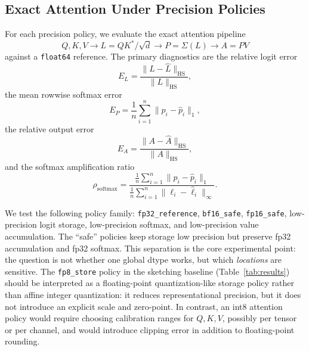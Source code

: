\subsection{Exact Attention Under Precision Policies}

For each precision policy, we evaluate the exact attention pipeline
\[
    Q,K,V \to L = QK^*/\sqrt d \to P = \Sigma(L) \to A = PV
\]
against a \texttt{float64} reference. The primary diagnostics are the relative logit error
\[
    E_L = \frac{\|L-\widehat L\|_{\mathrm{HS}}}{\|L\|_{\mathrm{HS}}},
\]
the mean rowwise softmax error
\[
    E_P = \frac1n \sum_{i=1}^n \|p_i-\widehat p_i\|_1,
\]
the relative output error
\[
    E_A = \frac{\|A-\widehat A\|_{\mathrm{HS}}}{\|A\|_{\mathrm{HS}}},
\]
and the softmax amplification ratio
\[
    \rho_{\mathrm{softmax}} = \frac{\frac1n \sum_{i=1}^n \|p_i-\widehat p_i\|_1}{\frac1n \sum_{i=1}^n \|\ell_i-\widehat \ell_i\|_\infty}.
\]

We test the following policy family: \texttt{fp32\_reference}, \texttt{bf16\_safe}, \texttt{fp16\_safe}, low-precision logit storage, low-precision softmax, and low-precision value accumulation. The ``safe'' policies keep storage low precision but preserve fp32 accumulation and fp32 softmax. This separation is the core experimental point: the question is not whether one global dtype works, but which \emph{locations} are sensitive. The \texttt{fp8\_store} policy in the sketching baseline (Table~\ref{tab:results}) should be interpreted as a floating-point quantization-like storage policy rather than affine integer quantization: it reduces representational precision, but it does not introduce an explicit scale and zero-point. In contrast, an int8 attention policy would require choosing calibration ranges for $Q,K,V$, possibly per tensor or per channel, and would introduce clipping error in addition to floating-point rounding.

